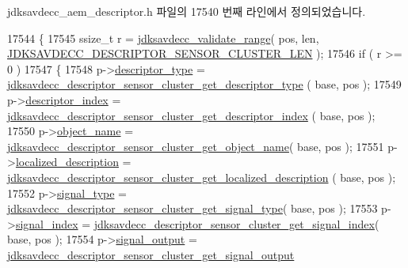 jdksavdecc\+\_\+aem\+\_\+descriptor.\+h 파일의 17540 번째 라인에서 정의되었습니다.


\begin{DoxyCode}
17544 \{
17545     ssize\_t r = \hyperlink{group__util_ga9c02bdfe76c69163647c3196db7a73a1}{jdksavdecc\_validate\_range}( pos, len, 
      \hyperlink{group__descriptor__sensor__cluster_ga80124b9d585173d579cc6ed930af3be1}{JDKSAVDECC\_DESCRIPTOR\_SENSOR\_CLUSTER\_LEN} );
17546     \textcolor{keywordflow}{if} ( r >= 0 )
17547     \{
17548         p->\hyperlink{structjdksavdecc__descriptor__sensor__unit__cluster_ab7c32b6c7131c13d4ea3b7ee2f09b78d}{descriptor\_type} = 
      \hyperlink{group__descriptor__sensor__cluster_ga5552a03d4beb49288bc8426461c958ec}{jdksavdecc\_descriptor\_sensor\_cluster\_get\_descriptor\_type}
      ( base, pos );
17549         p->\hyperlink{structjdksavdecc__descriptor__sensor__unit__cluster_a042bbc76d835b82d27c1932431ee38d4}{descriptor\_index} = 
      \hyperlink{group__descriptor__sensor__cluster_gaa892b76ea3cb78f5eb68adb2ce66f582}{jdksavdecc\_descriptor\_sensor\_cluster\_get\_descriptor\_index}
      ( base, pos );
17550         p->\hyperlink{structjdksavdecc__descriptor__sensor__unit__cluster_a7d1f5945a13863b1762fc6db74fa8f80}{object\_name} = 
      \hyperlink{group__descriptor__sensor__cluster_ga8ecdee7ec40b0aebe8e97c91c4ada189}{jdksavdecc\_descriptor\_sensor\_cluster\_get\_object\_name}( 
      base, pos );
17551         p->\hyperlink{structjdksavdecc__descriptor__sensor__unit__cluster_a0926f846ca65a83ad5bb06b4aff8f408}{localized\_description} = 
      \hyperlink{group__descriptor__sensor__cluster_ga2539040ea8413b4404529208b6a17a9c}{jdksavdecc\_descriptor\_sensor\_cluster\_get\_localized\_description}
      ( base, pos );
17552         p->\hyperlink{structjdksavdecc__descriptor__sensor__unit__cluster_a248e60ef99d5ed1779989d1dd6b6dc5a}{signal\_type} = 
      \hyperlink{group__descriptor__sensor__cluster_ga466d87386a21a3b07ce5a629964cd650}{jdksavdecc\_descriptor\_sensor\_cluster\_get\_signal\_type}( 
      base, pos );
17553         p->\hyperlink{structjdksavdecc__descriptor__sensor__unit__cluster_ae2e81a95ee9ad83f1fe22b6a1ee29075}{signal\_index} = 
      \hyperlink{group__descriptor__sensor__cluster_gac4019e46ff339e8569dc5aa57ae6789b}{jdksavdecc\_descriptor\_sensor\_cluster\_get\_signal\_index}(
       base, pos );
17554         p->\hyperlink{structjdksavdecc__descriptor__sensor__unit__cluster_ab4b91864e6fc335d7e86536d9f4461e4}{signal\_output} = 
      \hyperlink{group__descriptor__sensor__cluster_ga57941a09c67d7bfcedc9ed4d9cf04789}{jdksavdecc\_descriptor\_sensor\_cluster\_get\_signal\_output}

\end{DoxyCode}
